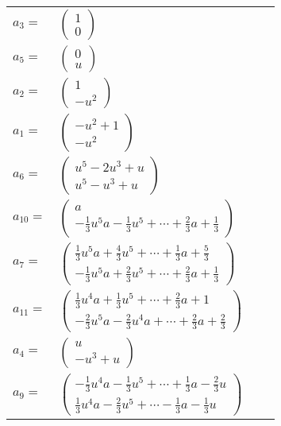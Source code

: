 \documentclass[1p]{elsarticle_modified}
\theoremstyle{definition}
\begin{document}
\begin{tabular}{m{7pt} m{180pt} m{7pt} m{180pt} }
\flushright $a_{3}=$&$\begin{pmatrix}1\\0\end{pmatrix}$ \\
\flushright $a_{5}=$&$\begin{pmatrix}0\\u\end{pmatrix}$ \\
\flushright $a_{2}=$&$\begin{pmatrix}1\\- u^2\end{pmatrix}$ \\
\flushright $a_{1}=$&$\begin{pmatrix}- u^2+1\\- u^2\end{pmatrix}$ \\
\flushright $a_{6}=$&$\begin{pmatrix}u^5-2 u^3+u\\u^5- u^3+u\end{pmatrix}$ \\
\flushright $a_{10}=$&$\begin{pmatrix}a\\-\frac{1}{3} u^5 a-\frac{1}{3} u^5+\cdots+\frac{2}{3} a+\frac{1}{3}\end{pmatrix}$ \\
\flushright $a_{7}=$&$\begin{pmatrix}\frac{1}{3} u^5 a+\frac{4}{3} u^5+\cdots+\frac{1}{3} a+\frac{5}{3}\\-\frac{1}{3} u^5 a+\frac{2}{3} u^5+\cdots+\frac{2}{3} a+\frac{1}{3}\end{pmatrix}$ \\
\flushright $a_{11}=$&$\begin{pmatrix}\frac{1}{3} u^4 a+\frac{1}{3} u^5+\cdots+\frac{2}{3} a+1\\-\frac{2}{3} u^5 a-\frac{2}{3} u^4 a+\cdots+\frac{2}{3} a+\frac{2}{3}\end{pmatrix}$ \\
\flushright $a_{4}=$&$\begin{pmatrix}u\\- u^3+u\end{pmatrix}$ \\
\flushright $a_{9}=$&$\begin{pmatrix}-\frac{1}{3} u^4 a-\frac{1}{3} u^5+\cdots+\frac{1}{3} a-\frac{2}{3} u\\\frac{1}{3} u^4 a-\frac{2}{3} u^5+\cdots-\frac{1}{3} a-\frac{1}{3} u\end{pmatrix}$ \\

\end{tabular}
\end{document}
